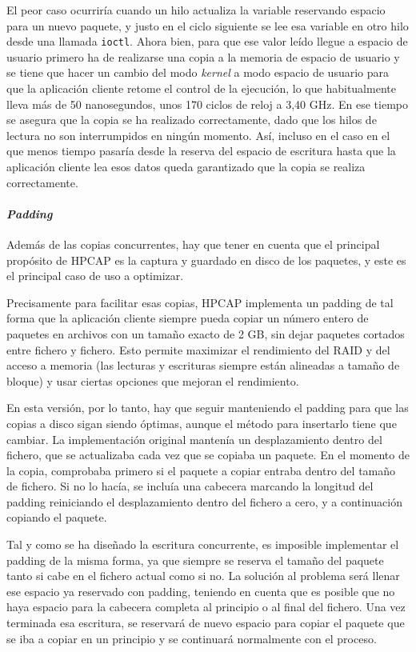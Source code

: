 \documentclass[oneside, draft]{epstfg}
\begin{document}
El peor caso ocurriría cuando un hilo actualiza la variable reservando espacio para un nuevo paquete, y justo en el ciclo siguiente se lee esa variable en otro hilo desde una llamada \texttt{ioctl}. Ahora bien, para que ese valor leído llegue a espacio de usuario primero ha de realizarse una copia a la memoria de espacio de usuario y se tiene que hacer un cambio del modo \textit{kernel} a modo espacio de usuario para que la aplicación cliente retome el control de la ejecución, lo que habitualmente lleva más de 50 nanosegundos, unos 170 ciclos de reloj a 3,40 GHz. En ese tiempo se asegura que la copia se ha realizado correctamente, dado que los hilos de lectura no son interrumpidos en ningún momento. Así, incluso en el caso en el que menos tiempo pasaría desde la reserva del espacio de escritura hasta que la aplicación cliente lea esos datos queda garantizado que la copia se realiza correctamente.

\paragraph{\textit{Padding}} Además de las copias concurrentes, hay que tener en cuenta que el principal propósito de HPCAP es la captura y guardado en disco de los paquetes, y este es el principal caso de uso a optimizar.

Precisamente para facilitar esas copias, HPCAP implementa un \gls{padding} \cite{MorenoTFM2012} de tal forma que la aplicación cliente siempre pueda copiar un número entero de paquetes en archivos con un tamaño exacto de 2 GB, sin dejar paquetes cortados entre fichero y fichero. Esto permite maximizar el rendimiento del \gls{RAID} y del acceso a memoria (las lecturas y escrituras siempre están alineadas a tamaño de bloque) y usar ciertas opciones que mejoran el rendimiento.

En esta versión, por lo tanto, hay que seguir manteniendo el \gls{padding} para que las copias a disco sigan siendo óptimas, aunque el método para insertarlo tiene que cambiar. La implementación original mantenía un desplazamiento dentro del fichero, que se actualizaba cada vez que se copiaba un paquete. En el momento de la copia, comprobaba primero si el paquete a copiar entraba dentro del tamaño de fichero. Si no lo hacía, se incluía una cabecera marcando la longitud del \gls{padding} reiniciando el desplazamiento dentro del fichero a cero, y a continuación copiando el paquete.

Tal y como se ha diseñado la escritura concurrente, es imposible implementar el \gls{padding} de la misma forma, ya que siempre se reserva el tamaño del paquete tanto si cabe en el fichero actual como si no. La solución al problema será llenar ese espacio ya reservado con \gls{padding}, teniendo en cuenta que es posible que no haya espacio para la cabecera completa al principio o al final del fichero. Una vez terminada esa escritura, se reservará de nuevo espacio para copiar el paquete que se iba a copiar en un principio y se continuará normalmente con el proceso.
\end{document}
